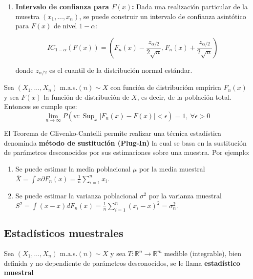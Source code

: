 \begin{proposición}
\begin{enumerate}
\begin{enumerate}
	      \end{enumerate}

	\item \textbf{Intervalo de confianza para \( F(x) \):}
	      Dada una realización particular de la muestra \( (x_1, \dots, x_n) \), se puede construir un intervalo de confianza asintótico para \( F(x) \) de nivel \( 1 - \alpha \):

	      $$ IC_{1-\alpha}(F(x)) = \left( F_n(x) - \frac{z_{\alpha/2}}{2\sqrt{n}}, F_n(x) + \frac{z_{\alpha/2}}{2\sqrt{n}} \right) $$

	      donde \( z_{\alpha/2} \) es el cuantil de la distribución normal estándar.

\end{enumerate}
\end{proposición}

\begin{teorema}
	Sea $\left(X_{1}, \ldots, X_{n}\right)$ m.a.s.$(n) \sim X$ con función de distribucióm empírica $F_{n}(x)$ y sea $F(x)$ la función de distribución de $X$, es decir, de la población total. Entonces se cumple que:
	\[\lim _{n \rightarrow \infty} P\left(w: \operatorname{Sup}_{x}\left|F_{n}(x)-F(x)\right|<\epsilon\right)=1, \ \forall \epsilon>0\]
\end{teorema}

\begin{corolario}
	El Teorema de Glivenko-Cantelli permite realizar una técnica estadística denominda \textbf{método de sustitución (Plug-In)} la cual se basa en la sustitución de parámetros desconocidos por sus estimaciones sobre una muestra. Por ejemplo:
	\begin{enumerate}
		\item Se puede estimar la media poblacional $\mu$ por la media muestral $\bar{X} = \int x\partial{F_n(x)} = \frac{1}{n}\sum_{i = 1}^{n}x_i $.
		\item Se puede estimar la varianza poblacional $\sigma^2$ por la varianza muestral $S^2 = \int (x - \bar{x})dF_n(x) = \frac{1}{n}\sum_{i = 1}^{n}(x_i - \bar{x})^2 = \sigma_n^2$.
	\end{enumerate}
\end{corolario}

\subsection{Estadísticos muestrales}

\begin{definición}
Sea $\left(X_{1}, \ldots, X_{n}\right)$ m.a.s.$(n) \sim X$ y sea $T: \mathbb{R}^{n} \longrightarrow \mathbb{R}^{m}$ medible (integrable), bien definida y no dependiente de parámetros desconocidos, se le llama \textbf{estadístico muestral}
\end{definición}

